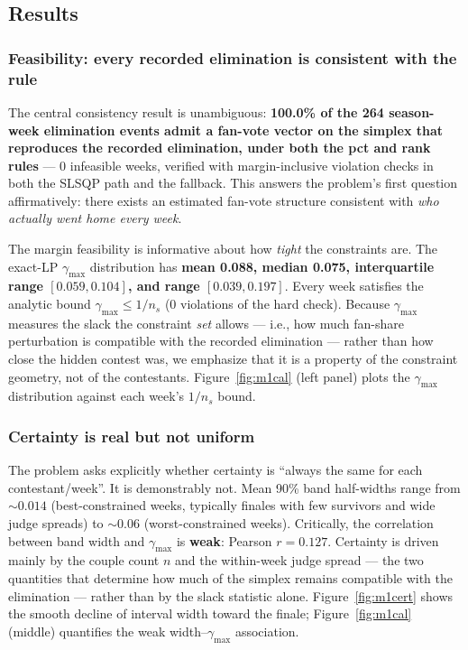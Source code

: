 \documentclass[11pt]{article}
\begin{document}
\subsection{Results}

\subsubsection{Feasibility: every recorded elimination is consistent with the rule}

The central consistency result is unambiguous: \textbf{100.0\% of the 264 season-week
elimination events admit a fan-vote vector on the simplex that reproduces the recorded
elimination, under both the pct and rank rules} --- 0 infeasible weeks, verified with
margin-inclusive violation checks in both the SLSQP path and the fallback. This answers
the problem's first question affirmatively: there exists an estimated fan-vote structure
consistent with \emph{who actually went home every week}.

The margin feasibility is informative about how \emph{tight} the constraints are. The
exact-LP $\gamma_{\max}$ distribution has \textbf{mean 0.088, median 0.075, interquartile
range $[0.059, 0.104]$, and range $[0.039, 0.197]$}. Every week satisfies the analytic
bound $\gamma_{\max} \le 1/n_s$ (0 violations of the hard check). Because
$\gamma_{\max}$ measures the slack the constraint \emph{set} allows --- i.e., how much
fan-share perturbation is compatible with the recorded elimination --- rather than how
close the hidden contest was, we emphasize that it is a property of the constraint
geometry, not of the contestants. Figure~\ref{fig:m1cal} (left panel) plots the
$\gamma_{\max}$ distribution against each week's $1/n_s$ bound.

\subsubsection{Certainty is real but not uniform}

The problem asks explicitly whether certainty is ``always the same for each
contestant/week''. It is demonstrably not. Mean 90\% band half-widths range from
$\sim 0.014$ (best-constrained weeks, typically finales with few survivors and wide judge
spreads) to $\sim 0.06$ (worst-constrained weeks). Critically, the correlation between
band width and $\gamma_{\max}$ is \textbf{weak}: Pearson $r = 0.127$. Certainty is driven
mainly by the couple count $n$ and the within-week judge spread --- the two quantities
that determine how much of the simplex remains compatible with the elimination --- rather
than by the slack statistic alone. Figure~\ref{fig:m1cert} shows the smooth decline of
interval width toward the finale; Figure~\ref{fig:m1cal} (middle) quantifies the weak
width--$\gamma_{\max}$ association.
\end{document}
